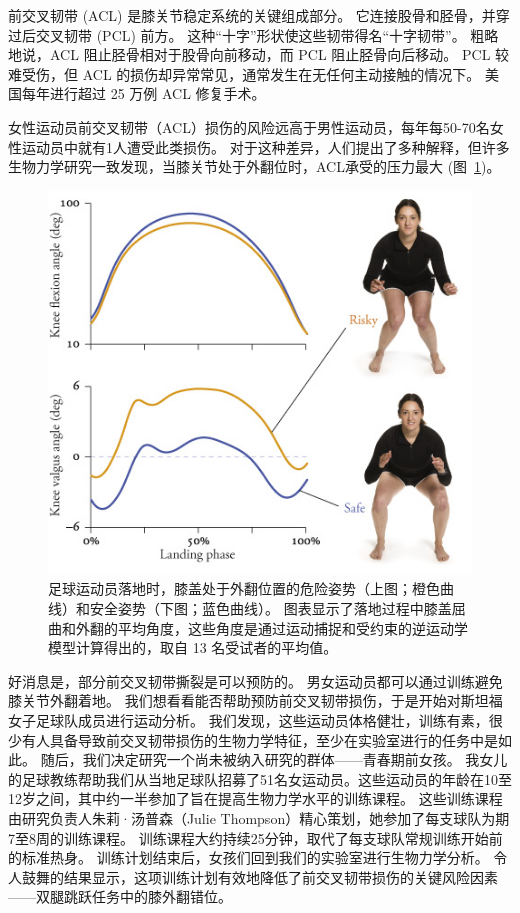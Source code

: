 前交叉韧带 (ACL) 是膝关节稳定系统的关键组成部分。
它连接股骨和胫骨，并穿过后交叉韧带 (PCL) 前方。
这种“十字”形状使这些韧带得名“十字韧带”。
粗略地说，ACL 阻止胫骨相对于股骨向前移动，而 PCL 阻止胫骨向后移动。
PCL 较难受伤，但 ACL 的损伤却异常常见，通常发生在无任何主动接触的情况下。
美国每年进行超过 25 万例 ACL 修复手术。


女性运动员前交叉韧带（ACL）损伤的风险远高于男性运动员，每年每50-70名女性运动员中就有1人遭受此类损伤\cite{bates2016motion}。
对于这种差异，人们提出了多种解释，但许多生物力学研究一致发现，当膝关节处于外翻位时，ACL承受的压力最大 (图~\ref{fig:7_17})。


\begin{figure}[!htb]
	\centering
	\includegraphics[width=0.8\linewidth]{chap7/7_17}
	\caption{足球运动员落地时，膝盖处于外翻位置的危险姿势（上图；橙色曲线）和安全姿势（下图；蓝色曲线）。
		图表显示了落地过程中膝盖屈曲和外翻的平均角度，这些角度是通过运动捕捉和受约束的逆运动学模型计算得出的，取自 13 名受试者的平均值\cite{thompson2017biomechanical}。 \label{fig:7_17}}
\end{figure}


好消息是，部分前交叉韧带撕裂是可以预防的。
男女运动员都可以通过训练避免膝关节外翻着地。
我们想看看能否帮助预防前交叉韧带损伤，于是开始对斯坦福女子足球队成员进行运动分析。
我们发现，这些运动员体格健壮，训练有素，很少有人具备导致前交叉韧带损伤的生物力学特征，至少在实验室进行的任务中是如此。
随后，我们决定研究一个尚未被纳入研究的群体——青春期前女孩。
我女儿的足球教练帮助我们从当地足球队招募了51名女运动员。这些运动员的年龄在10至12岁之间，其中约一半参加了旨在提高生物力学水平的训练课程。
这些训练课程由研究负责人朱莉·汤普森（Julie Thompson）精心策划，她参加了每支球队为期7至8周的训练课程。
训练课程大约持续25分钟，取代了每支球队常规训练开始前的标准热身。
训练计划结束后，女孩们回到我们的实验室进行生物力学分析。
令人鼓舞的结果显示，这项训练计划有效地降低了前交叉韧带损伤的关键风险因素——双腿跳跃任务中的膝外翻错位。


